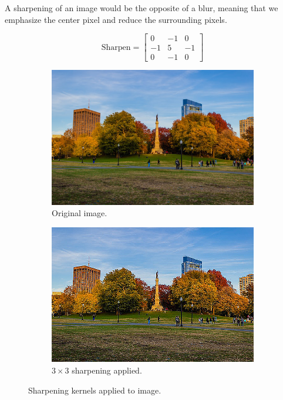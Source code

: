 \documentclass{article}
\begin{document}
    \begin{example}[Sharpening]
      A sharpening of an image would be the opposite of a blur, meaning that we emphasize the center pixel and reduce the surrounding pixels. 

      \[\text{Sharpen} = \begin{bmatrix} 0 & -1 & 0 \\ -1 & 5 & -1 \\ 0 & -1 & 0 \end{bmatrix}\]

      \begin{figure}[H]
        \centering
        \begin{subfigure}[b]{0.45\textwidth}
        \centering
            \includegraphics[width=\textwidth]{img/OpenCV/Park_Full.png}
            \caption{Original image. }
            \label{fig:Park_Full_def}
        \end{subfigure}
        \begin{subfigure}[b]{0.45\textwidth}
        \centering
            \includegraphics[width=\textwidth]{img/OpenCV/Sharpen.png}
            \caption{$3 \times 3$ sharpening applied. }
            \label{fig:Sharpen}
        \end{subfigure}

        \label{fig:sharpen}
        \caption{Sharpening kernels applied to image. }
      \end{figure}
    \end{example}
\end{document}
